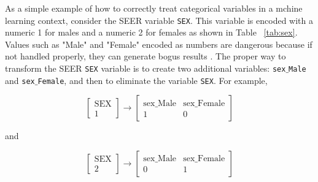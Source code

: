 \documentclass[a4paper,11pt]{article}
\newcommand{\code}[1]{\colorbox{light-gray}{\texttt{#1}}}
\begin{document}
As a simple example of how to correctly treat categorical variables in a mchine learning context, consider the SEER variable \code{SEX}. This variable is encoded with a numeric 1 for males and a numeric 2 for females as shown in Table ~\ref{tab:sex}. Values such as "Male" and "Female" encoded as numbers are dangerous because if not handled properly, they can generate bogus results \cite{downey}. The proper way to transform the SEER \code{SEX} variable is to create two additional variables: \code{sex$\_$Male} and \code{sex$\_$Female}, and then to eliminate the variable \code{SEX}. For example,





\begin{equation}
\left[ \begin{array}{l}
\mbox{SEX} \\ \hline
1 \end{array} \right]
\rightarrow 
\left[ \begin{array}{l|l}
\mbox{sex$\_$Male} & \mbox{sex$\_$Female} \\ \hline
1 & 0 \end{array} \right]
\label{eqn:onehotmale}
\end{equation}

and 

\begin{equation}
\left[ \begin{array}{l}
\mbox{SEX} \\ \hline
2 \end{array} \right]
\rightarrow 
\left[ \begin{array}{l|l}
\mbox{sex$\_$Male} & \mbox{sex$\_$Female} \\ \hline
0 & 1 \end{array} \right]
\label{eqn:onehotfemale}
\end{equation}
\end{document}
